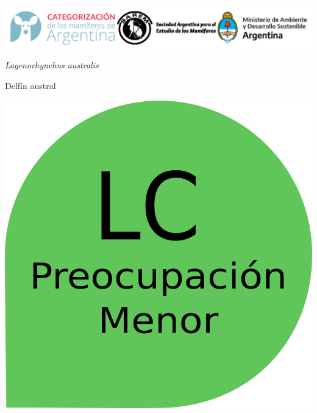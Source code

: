 \documentclass[
  x11names]{article}
\author{}
\date{\vspace{-2.5em}Fecha de creación: 03 April, 2023}
\begin{document}
\setmainfont{Arial}
\setsansfont{Arial}
\setmonofont{Arial}

\newcommand\invisiblesection[1]{%
  \refstepcounter{section}%
  \addcontentsline{toc}{section}{\protect\numberline{\thesection}#1}%
  \sectionmark{#1}}


%
\vspace{-0.4cm}

\includegraphics[width=1\linewidth]{images/Base_info/logo}

\vspace{1cm}

\begin{minipage}{0.7\textwidth}
\vspace{0.3cm}
\fontsize{20}{24}\selectfont\textit{Lagenorhynchus australis}

\vspace{0.3cm}
\fontsize{30}{36}\selectfont Delfín austral
\end{minipage}
\hspace{0.05\textwidth}
\begin{minipage}{0.25\textwidth}
\includegraphics[width=\textwidth]{images/lc.png}
\end{minipage}
\end{document}
